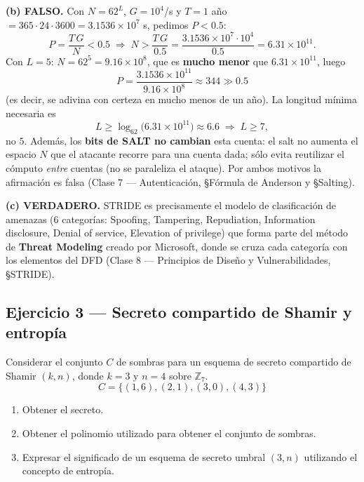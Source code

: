 \medskip
\textbf{(b) FALSO.} Con $N = 62^{L}$, $G = 10^{4}$/s y $T = 1$ año
$= 365\cdot24\cdot3600 = 3.1536\times10^{7}$ s, pedimos $P<0.5$:
\begin{equation}
  P = \frac{T\,G}{N} < 0.5
  \;\Longrightarrow\; N > \frac{T\,G}{0.5}
  = \frac{3.1536\times10^{7}\cdot 10^{4}}{0.5}
  = 6.31\times10^{11}.
\end{equation}
Con $L=5$: $N = 62^{5} = 9.16\times10^{8}$, que es \textbf{mucho menor} que $6.31\times10^{11}$,
luego
\begin{equation}
  P = \frac{3.1536\times10^{11}}{9.16\times10^{8}} \approx 344 \gg 0.5
\end{equation}
(es decir, se adivina con certeza en mucho menos de un año). La longitud mínima necesaria es
\begin{equation*}
  L \ge \log_{62}\!\bigl(6.31\times10^{11}\bigr) \approx 6.6 \;\Rightarrow\; L \ge 7,
\end{equation*}
no $5$. Además, los \textbf{bits de SALT no cambian} esta cuenta: el salt no aumenta el espacio
$N$ que el atacante recorre para una cuenta dada; sólo evita reutilizar el cómputo \emph{entre}
cuentas (no se paraleliza el ataque). Por ambos motivos la afirmación es falsa (Clase 7 —
Autenticación, \S Fórmula de Anderson y \S Salting).

\medskip
\textbf{(c) VERDADERO.} STRIDE es precisamente el modelo de clasificación de amenazas (6
categorías: Spoofing, Tampering, Repudiation, Information disclosure, Denial of service,
Elevation of privilege) que forma parte del método de \textbf{Threat Modeling} creado por
Microsoft, donde se cruza cada categoría con los elementos del DFD (Clase 8 — Principios de
Diseño y Vulnerabilidades, \S STRIDE).

\subsection{Ejercicio 3 — Secreto compartido de Shamir y entropía}

\begin{consigna}
Considerar el conjunto $C$ de sombras para un esquema de secreto compartido de Shamir $(k,n)$, donde $k=3$ y $n=4$ sobre $\mathbb{Z}_7$.
\[
  C = \{(1,6),(2,1),(3,0),(4,3)\}
\]
\begin{enumerate}[label=\alph*)]
  \item Obtener el secreto.
  \item Obtener el polinomio utilizado para obtener el conjunto de sombras.
  \item Expresar el significado de un esquema de secreto umbral $(3,n)$ utilizando el concepto de entropía.
\end{enumerate}
\end{consigna}

